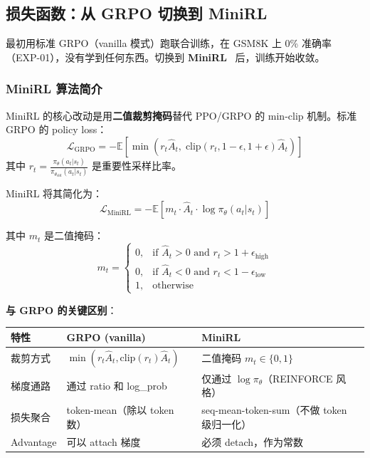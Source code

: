 \documentclass[11pt,a4paper]{article}
\begin{document}
\subsection{损失函数：从 GRPO 切换到 MiniRL}

最初用标准 GRPO（vanilla 模式）跑联合训练，在 GSM8K 上 0\% 准确率（EXP-01），没有学到任何东西。切换到 \textbf{MiniRL}~\cite{minirl} 后，训练开始收敛。

\subsubsection{MiniRL 算法简介}

MiniRL 的核心改动是用\textbf{二值裁剪掩码}替代 PPO/GRPO 的 min-clip 机制。标准 GRPO 的 policy loss：
\begin{equation}
\mathcal{L}_{\text{GRPO}} = -\mathbb{E}\left[\min\left(r_t \hat{A}_t, \; \text{clip}(r_t, 1-\epsilon, 1+\epsilon) \hat{A}_t\right)\right]
\end{equation}
其中 $r_t = \frac{\pi_\theta(a_t|s_t)}{\pi_{\theta_{\text{old}}}(a_t|s_t)}$ 是重要性采样比率。

MiniRL 将其简化为：
\begin{equation}
\mathcal{L}_{\text{MiniRL}} = -\mathbb{E}\left[m_t \cdot \hat{A}_t \cdot \log \pi_\theta(a_t|s_t)\right]
\end{equation}

其中 $m_t$ 是二值掩码：
\begin{equation}
m_t = \begin{cases}
0, & \text{if } \hat{A}_t > 0 \text{ and } r_t > 1 + \epsilon_{\text{high}} \\
0, & \text{if } \hat{A}_t < 0 \text{ and } r_t < 1 - \epsilon_{\text{low}} \\
1, & \text{otherwise}
\end{cases}
\end{equation}

\textbf{与 GRPO 的关键区别}：

\begin{table}[h]
\centering
\begin{tabular}{p{3cm}p{5.5cm}p{5.5cm}}
\toprule
\textbf{特性} & \textbf{GRPO (vanilla)} & \textbf{MiniRL} \\
\midrule
裁剪方式 & $\min(r_t \hat{A}_t, \text{clip}(r_t) \hat{A}_t)$ & 二值掩码 $m_t \in \{0, 1\}$ \\
梯度通路 & 通过 ratio 和 log\_prob & 仅通过 $\log \pi_\theta$（REINFORCE 风格） \\
损失聚合 & token-mean（除以 token 数） & seq-mean-token-sum（不做 token 级归一化） \\
Advantage & 可以 attach 梯度 & 必须 detach，作为常数 \\
\bottomrule
\end{tabular}
\end{table}
\end{document}
